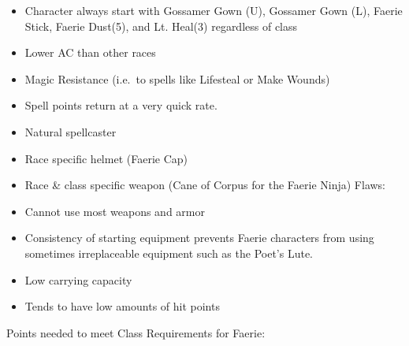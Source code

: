 \documentclass[12pt]{article}
\begin{document}
\begin{itemize}
\item
  Character always start with Gossamer Gown (U), Gossamer Gown (L),
  Faerie Stick, Faerie Dust(5), and Lt. Heal(3) regardless of class
\item
  Lower AC than other races
\item
  Magic Resistance (i.e.~to spells like Lifesteal or Make Wounds)
\item
  Spell points return at a very quick rate.
\item
  Natural spellcaster
\item
  Race specific helmet (Faerie Cap)
\item
  Race \& class specific weapon (Cane of Corpus for the Faerie Ninja)
  Flaws:
\item
  Cannot use most weapons and armor
\item
  Consistency of starting equipment prevents Faerie characters from
  using sometimes irreplaceable equipment such as the Poet's Lute.
\item
  Low carrying capacity
\item
  Tends to have low amounts of hit points
\end{itemize}

Points needed to meet Class Requirements for Faerie:
\end{document}
